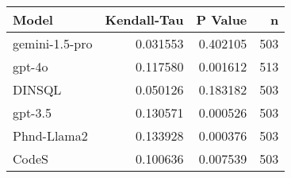 \begin{tabular}{lrrr}
\toprule
Model & Kendall-Tau & P Value & n \\
\midrule
gemini-1.5-pro & 0.031553 & 0.402105 & 503 \\
gpt-4o & 0.117580 & 0.001612 & 513 \\
DINSQL & 0.050126 & 0.183182 & 503 \\
gpt-3.5 & 0.130571 & 0.000526 & 503 \\
Phnd-Llama2 & 0.133928 & 0.000376 & 503 \\
CodeS & 0.100636 & 0.007539 & 503 \\
\bottomrule
\end{tabular}
